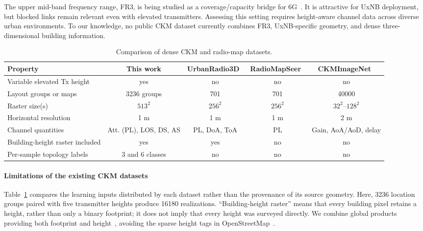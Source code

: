 \documentclass[10pt,conference,letterpaper]{IEEEtran}
\begin{document}
The upper mid-band frequency range, FR3, is being studied as a
coverage/capacity bridge for 6G~\cite{Cui2024}. It is attractive for UxNB
deployment, but blocked links remain relevant even with elevated transmitters.
Assessing this setting requires height-aware channel data across diverse urban
environments. To our knowledge, no public CKM dataset currently combines FR3,
UxNB-specific geometry, and dense three-dimensional building information.

\begin{table}[t]
\centering
\caption{Comparison of dense CKM and radio-map datasets.}
\scriptsize
\setlength{\tabcolsep}{4pt}
\begin{tabular}{@{}lcccc@{}}
\toprule
Property & This work & UrbanRadio3D~\cite{radiodiff3d2026} & RadioMapSeer~\cite{dataset2212} & CKMImageNet~\cite{ckmimagenet2025} \\
\midrule
Variable elevated Tx height & yes & no & no & no \\
Layout groups or maps & 3236 groups & 701 & 701 & 40000 \\
Raster size(s) & $513^2$ & $256^2$ & $256^2$ & $32^2$--$128^2$ \\
Horizontal resolution & 1 m & 1 m & 1 m & 2 m \\
Channel quantities & Att. (PL), LOS, DS, AS & PL, DoA, ToA & PL & Gain, AoA/AoD, delay \\
Building-height raster included & yes & yes & no & no \\
Per-sample topology labels & 3 and 6 classes & no & no & no \\
\bottomrule
\end{tabular}
\label{tab:datasets}
\vspace{-8pt}
\end{table}

\paragraph{Limitations of the existing CKM datasets}
Table~\ref{tab:datasets} compares the learning inputs distributed by each
dataset rather than the provenance of its source geometry. Here, 3236 location
groups paired with five transmitter heights produce 16180 realizations.
``Building-height raster'' means that every building pixel retains a height,
rather than only a binary footprint; it does not imply that every height was
surveyed directly. We combine global products providing both footprint and
height~\cite{Che2024globfp,Zhu2025atlas}, avoiding the sparse height tags in
OpenStreetMap~\cite{Bernard2022}.
\end{document}
